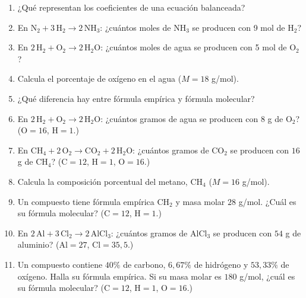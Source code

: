 \documentclass[12pt, letterpaper]{article}
\begin{document}
\begin{enumerate}[leftmargin=*, resume]
  \item \facil{} ¿Qué representan los coeficientes de una ecuación balanceada?

  \item \facil{} En $\text{N}_2 + 3\,\text{H}_2 \rightarrow 2\,\text{NH}_3$: ¿cuántos moles de $\text{NH}_3$ se producen con 9 mol de $\text{H}_2$?

  \item \facil{} En $2\,\text{H}_2 + \text{O}_2 \rightarrow 2\,\text{H}_2\text{O}$: ¿cuántos moles de agua se producen con 5 mol de $\text{O}_2$?

  \item \facil{} Calcula el porcentaje de oxígeno en el agua ($M = 18$ g/mol).

  \item \facil{} ¿Qué diferencia hay entre fórmula empírica y fórmula molecular?

  \item \medio{} En $2\,\text{H}_2 + \text{O}_2 \rightarrow 2\,\text{H}_2\text{O}$: ¿cuántos gramos de agua se producen con $8$ g de $\text{O}_2$? ($\text{O} = 16$, $\text{H} = 1$.)

  \item \medio{} En $\text{CH}_4 + 2\,\text{O}_2 \rightarrow \text{CO}_2 + 2\,\text{H}_2\text{O}$: ¿cuántos gramos de $\text{CO}_2$ se producen con $16$ g de $\text{CH}_4$? ($\text{C} = 12$, $\text{H} = 1$, $\text{O} = 16$.)

  \item \medio{} Calcula la composición porcentual del metano, $\text{CH}_4$ ($M = 16$ g/mol).

  \item \medio{} Un compuesto tiene fórmula empírica $\text{CH}_2$ y masa molar $28$ g/mol. ¿Cuál es su fórmula molecular? ($\text{C} = 12$, $\text{H} = 1$.)

  \item \dificil{} En $2\,\text{Al} + 3\,\text{Cl}_2 \rightarrow 2\,\text{AlCl}_3$: ¿cuántos gramos de $\text{AlCl}_3$ se producen con $54$ g de aluminio? ($\text{Al} = 27$, $\text{Cl} = 35{,}5$.)

  \item \dificil{} Un compuesto contiene $40\%$ de carbono, $6{,}67\%$ de hidrógeno y $53{,}33\%$ de oxígeno. Halla su fórmula empírica. Si su masa molar es $180$ g/mol, ¿cuál es su fórmula molecular? ($\text{C} = 12$, $\text{H} = 1$, $\text{O} = 16$.)
\end{enumerate}
\end{document}
